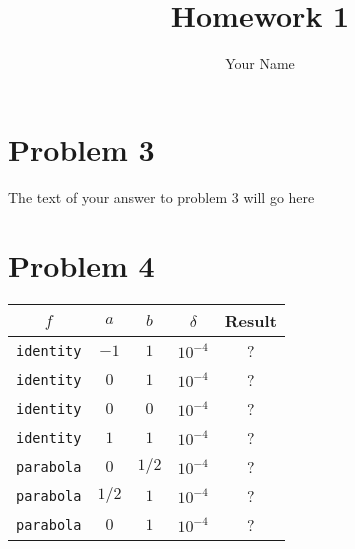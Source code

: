 \documentclass[12pt]{article}
\title{Homework 1}
\author{Your Name}
\begin{document}
\maketitle

\section*{Problem 3}

The text of your answer to problem 3 will go here

\section*{Problem 4}

\begin{center}
\begin{tabular}{ccccc}
$f$ & $a$ & $b$ & $\delta$ & Result \\ \hline
\texttt{identity} & $-1$ & $1$ & $10^{-4}$ & ? \\
\texttt{identity} & $0$ & $1$ & $10^{-4}$ & ? \\
\texttt{identity} & $0$ & $0$ & $10^{-4}$ & ? \\
\texttt{identity} & $1$ & $1$ & $10^{-4}$ & ? \\
\texttt{parabola} & $0$ & $1/2$ & $10^{-4}$ & ? \\
\texttt{parabola} & $1/2$ & $1$ & $10^{-4}$ & ? \\
\texttt{parabola} & $0$ & $1$ & $10^{-4}$ & ?
\end{tabular}
\end{center}
\end{document}
